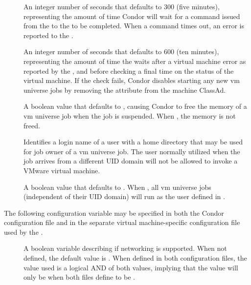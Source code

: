 \begin{description}
\item[]
  \label{param:VMGAHPReqTimeout}
  An integer number of seconds that defaults to 300 (five minutes),
  representing the amount of time Condor will wait for a command issued
  from the  to the  to be completed.
  When a command times out, an error is reported to the .

\item[]
  \label{param:VMRecheckInterval}
  An integer number of seconds that defaults to 600 (ten minutes),
  representing the amount of time the  waits after a
  virtual machine error as reported by the ,
  and before checking a final time on the status of the virtual machine.
  If the check fails, Condor disables starting any new vm universe jobs
  by removing the  attribute from the machine ClassAd.

\item[]
  \label{param:VMSoftSuspend}
  A boolean value that defaults to ,
  causing Condor to free the memory of a vm universe job when
  the job is suspended.
  When , the memory is not freed.

\item[]
  \label{param:VMUnivNobodyUser}
  Identifies a login name of a user with a home directory that
  may be used for job owner of a vm universe job.
  The  user normally utilized when the job arrives
  from a different UID domain will not be allowed to invoke a VMware
  virtual machine.

\item[]
  \label{param:AlwaysVMUnivUseNobody}
  A boolean value that defaults to .
  When , all vm universe jobs (independent of their
  UID domain) will run as the user defined in .
\end{description}

The following configuration variable may be specified in both
the Condor configuration file and in the separate
virtual machine-specific configuration file used by the .

\begin{description}
\item[]
  \label{param:VMNetworking}
  A boolean variable describing if networking is supported.
  When not defined, the default value is .
  When defined in both configuration files,
  the value used is a logical AND of both values,
  implying that the value will only be  when
  both files define  to be .
\end{description}


